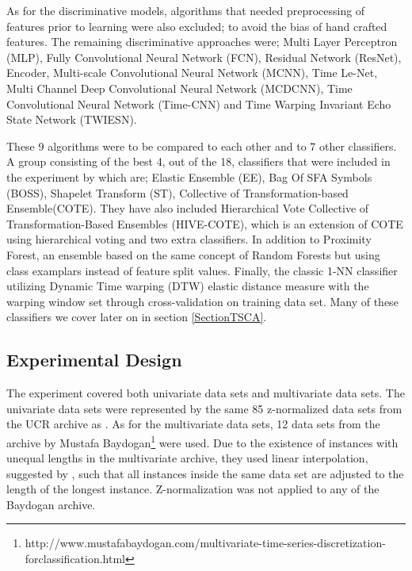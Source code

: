 As for the discriminative models, algorithms that needed preprocessing of features prior to learning were also excluded; to avoid the bias of hand crafted features.
The remaining discriminative approaches were; Multi Layer Perceptron (MLP), Fully Convolutional Neural Network (FCN), Residual Network (ResNet), Encoder, Multi-scale Convolutional Neural Network (MCNN),
Time Le-Net, Multi Channel Deep Convolutional Neural Network (MCDCNN), Time Convolutional Neural Network (Time-CNN) and Time Warping Invariant Echo State Network (TWIESN).

These 9 algorithms were to be compared to each other and to 7 other classifiers.
A group consisting of the best 4, out of the 18, classifiers that were included in the experiment by \cite{bagnall2017great} which are; Elastic Ensemble (EE), Bag Of SFA Symbols (BOSS), Shapelet Transform (ST), Collective of Transformation-based Ensemble(COTE).
They have also included Hierarchical Vote Collective of Transformation-Based Ensembles (HIVE-COTE), which is an extension of COTE using hierarchical voting and two extra classifiers.
In addition to Proximity Forest, an ensemble based on the same concept of Random Forests but using class examplars instead of feature split values.
Finally, the classic 1-NN classifier utilizing Dynamic Time warping (DTW) elastic distance measure with the warping window set through cross-validation on training data set.
Many of these classifiers we cover later on in section \ref{SectionTSCA}.

\subsection{Experimental Design}
\label{subsectionDeepLearningReviewExperiment}
The experiment covered both univariate data sets and multivariate data sets. The univariate data sets were represented by the same 85 z-normalized data sets from the UCR archive as \cite{bagnall2017great}.
As for the multivariate data sets, 12 data sets from the archive by Mustafa Baydogan\footnote{http://www.mustafabaydogan.com/multivariate-time-series-discretization-forclassification.html}
were used. Due to the existence of instances with unequal lengths in the multivariate archive, they used linear interpolation, suggested by \cite{ratanamahatana2005three},
such that all instances inside the same data set are adjusted to the length of the longest instance. Z-normalization was not applied to any of the Baydogan archive.

